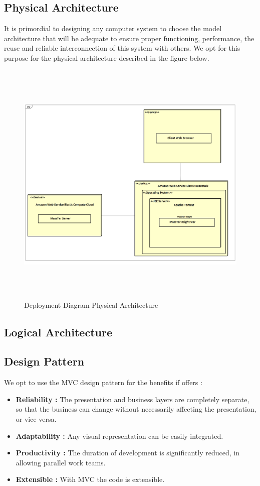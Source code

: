 	\subsection{Physical Architecture}
	It is primordial to designing any computer system to choose the model architecture that will be adequate to ensure proper functioning, performance, the reuse and reliable interconnection of this system with others. We opt for this purpose for the physical architecture described in the figure below.
	\begin{figure}[h]
		\centering
		\includegraphics[width=16.5cm,height=12cm]{DeploymentDiagramPhysicalArchitecture.png}
		\caption{Deployment Diagram Physical Architecture}
	\end{figure}  

	\clearpage
    \newpage  
	
	\subsection{Logical Architecture}



    \clearpage
	\newpage
	\subsection{Design Pattern}
		We opt to use the MVC design pattern for the benefits if offers :
	\begin{itemize}
		\item \textbf{Reliability : }The presentation and business layers are completely separate, so that the business can change without necessarily affecting the presentation, or vice versa.
		\item \textbf{Adaptability : }Any visual representation can be easily integrated.
		\item \textbf{Productivity : }The duration of development is significantly reduced, in allowing parallel work teams.
		\item \textbf{Extensible : } With MVC the code is extensible.
	\end{itemize}

